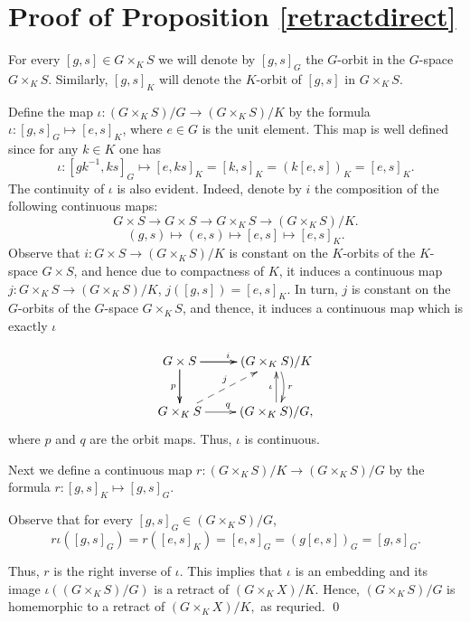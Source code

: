 \documentclass{amsart}
\begin{document}
\section{Proof of Proposition \ref{retractdirect}}\label{Prop} 

 For every $[g, s]\in G \times_K S$ we will denote by $[g, s]_G$ the $G$-orbit in the $G$-space $G \times_K S$. Similarly, $[g, s]_K$ will denote the $K$-orbit of $[g, s]$ in $G \times_K S$.  
  
 Define the map   $\iota: (G\times_K S)/G  \to (G \times_K S)/K$ by the formula $\iota: [g, s]_G\mapsto [e, s]_K$, where $e\in G$ is the unit element. This map is well defined since for any 
 $k\in K$ one has 
 $$\iota : [gk^{-1}, ks]_G\mapsto [e, ks]_K=[k, s]_K= (k[e, s])_K= [e, s]_K.$$
 The continuity of $\iota$ is also  evident. Indeed, denote by $i$  the composition of the following continuous maps:
   $$G\times S   \to G \times S\to G\times_K S\to  (G \times_K S)/K. $$ 
    $$(g, s)\mapsto (e, s)\mapsto [e, s]\mapsto [e, s]_K.$$   
    Observe that  $i:G\times S  \to (G \times_K S)/K$ is constant on the $K$-orbits of the $K$-space $G\times S$, and hence due to compactness of $K$, it induces a continuous map $j:G\times_K S  \to (G \times_K S)/K$, $j([g, s])=    [e, s]_K$. In turn, $j$ is constant on the $G$-orbits of the $G$-space $G \times_K S$, and thence, it induces a continuous map which is exactly $\iota$   
             
             
             \[ \xymatrix{G \times S \ar[r]^i \ar[d] \ar[d]_p\ar[r]  &  (G \times_K S)/K \ar@/^/[d]^ r\\
              G \times_K S \ar [r]^q\ar@{-->}[ur]^j   &  (G \times_K S)/G  \ar[u]^\iota,
             }   \]             
             where $p$ and $q$ are the orbit maps.          Thus, $\iota$ is continuous.
             
              Next we define a continuous map  $r: (G\times_K S)/K  \to (G \times_K S)/G$ by the formula $r: [g, s]_K\mapsto [g, s]_G$.               
             
       
              
        Observe that for every $[g, s]_G\in  (G \times_K S)/G$,
    \[ r {\iota}([g, s]_G) = r([e, s]_K) = [e, s]_G =  (g[e, s])_G=[g, s]_G. \]

 
 Thus, $r$ is the right inverse of ${\iota}$. This implies that ${\iota}$ is an embedding and its  image ${\iota}((G \times_K S)/G)$ is a retract of     $(G \times_K X)/{K}.$ Hence, $(G \times_K S)/G$ is homemorphic to a retract of $(G \times_K X)/{K},$ as requried. 
\qed
\end{document}
